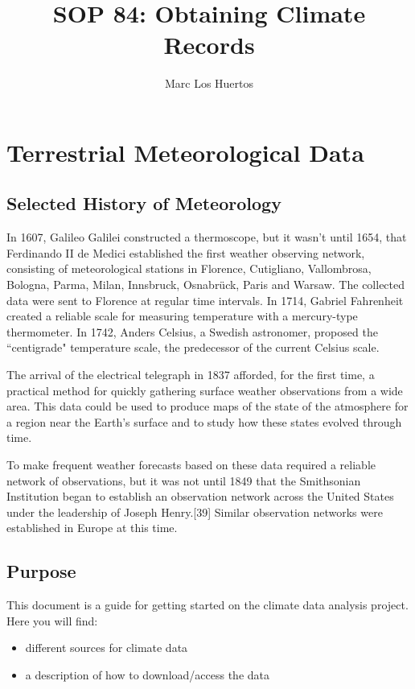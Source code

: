 \documentclass{article}\usepackage[]{graphicx}\usepackage[]{color}
\title{SOP 84: Obtaining Climate Records}
\author{Marc Los Huertos}
\begin{document}
\maketitle

\section{Terrestrial Meteorological Data}

\subsection{Selected History of Meteorology}

In 1607, Galileo Galilei constructed a thermoscope, but it wasn't until 1654, that Ferdinando II de Medici established the first weather observing network, consisting of meteorological stations in Florence, Cutigliano, Vallombrosa, Bologna, Parma, Milan, Innsbruck, Osnabrück, Paris and Warsaw. The collected data were sent to Florence at regular time intervals. In 1714, Gabriel Fahrenheit created a reliable scale for measuring temperature with a mercury-type thermometer. In 1742, Anders Celsius, a Swedish astronomer, proposed the ``centigrade" temperature scale, the predecessor of the current Celsius scale.

The arrival of the electrical telegraph in 1837 afforded, for the first time, a practical method for quickly gathering surface weather observations from a wide area. This data could be used to produce maps of the state of the atmosphere for a region near the Earth's surface and to study how these states evolved through time. 

To make frequent weather forecasts based on these data required a reliable network of observations, but it was not until 1849 that the Smithsonian Institution began to establish an observation network across the United States under the leadership of Joseph Henry.[39] Similar observation networks were established in Europe at this time. 

\subsection{Purpose}
This document is a guide for getting started on the climate data analysis project. Here you will find: 
\begin{itemize}
\item different sources for climate data
\item a description of how to download/access the data
\end{itemize}
\end{document}
